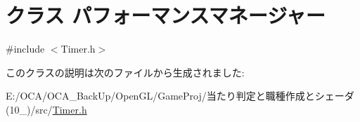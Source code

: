 \hypertarget{class_xE3_x83_x91_xE3_x83_x95_xE3_x82_xA9_xE3_x83_xBC_xE3_x83_x9E_xE3_x83_xB3_xE3_x82_xB9_xE3_x875bd1b2277ce29c6a263e8a9ae9b799c}{\section{クラス パフォーマンスマネージャー}
\label{class_xE3_x83_x91_xE3_x83_x95_xE3_x82_xA9_xE3_x83_xBC_xE3_x83_x9E_xE3_x83_xB3_xE3_x82_xB9_xE3_x875bd1b2277ce29c6a263e8a9ae9b799c}
}


{\ttfamily \#include $<$Timer.\-h$>$}



このクラスの説明は次のファイルから生成されました\-:\begin{DoxyCompactItemize}
\item 
E\-:/\-O\-C\-A/\-O\-C\-A\-\_\-\-Back\-Up/\-Open\-G\-L/\-Game\-Proj/当たり判定と職種作成とシェーダ(10\-\_)/src/\hyperlink{_timer_8h}{Timer.\-h}\end{DoxyCompactItemize}
